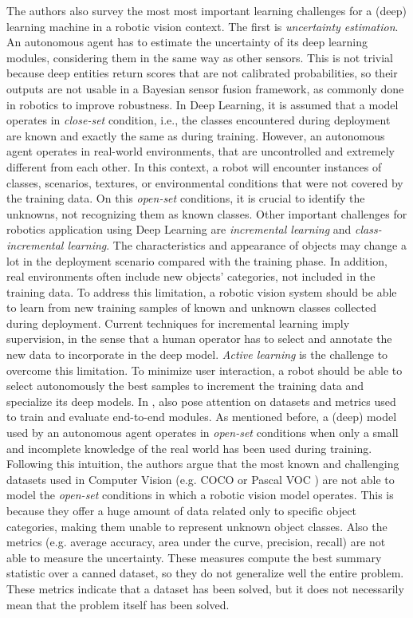  The authors also survey the most most important learning challenges for a (deep) learning machine in a robotic vision context. The first is \textit{uncertainty estimation}. An autonomous agent has to estimate the uncertainty of its deep learning modules, considering them in the same way as other sensors. This is not trivial because deep entities return scores that are not calibrated probabilities, so their outputs are not usable in a Bayesian sensor fusion framework, as commonly done in robotics to improve robustness. In Deep Learning, it is assumed that a model operates in \textit{close-set} condition,  i.e., the classes encountered during deployment are known and exactly the same as during training. However, an autonomous agent operates in real-world environments, that are uncontrolled and extremely different from each other. In this context, a robot will encounter instances of classes, scenarios, textures, or environmental conditions that were not covered by the training data. On this \textit{open-set} conditions, it is crucial to identify the unknowns, not recognizing them as known classes. Other important challenges for robotics application using Deep Learning are \textit{incremental learning} and \textit{class-incremental learning}. The characteristics and appearance of objects may change a lot in the deployment scenario compared with the training phase. In addition, real environments often include new objects' categories, not included in the training data. To address this limitation, a robotic vision system should be able to learn from new training samples of known and unknown classes collected during deployment. Current techniques for incremental learning imply supervision, in the sense that a human operator has to select and annotate the new data to incorporate in the deep model. \textit{Active learning} is the challenge to overcome this limitation. To minimize user interaction, a robot should be able to select autonomously the best samples to increment the training data and specialize its deep models. In \cite{surveydeeplimits}, \citeauthor{surveydeeplimits} also pose attention on datasets and metrics used to train and evaluate end-to-end modules. As mentioned before, a (deep) model used by an autonomous agent operates in \textit{open-set} conditions when only a small and incomplete knowledge of the real world has been used during training. Following this intuition, the authors argue that the most known and challenging datasets used in Computer Vision (e.g. COCO \cite{coco} or Pascal VOC \cite{pascal}) are not able to model the \textit{open-set} conditions in which a robotic vision model operates. This is because they offer a huge amount of data related only to specific object categories, making them unable to represent unknown object classes. Also the metrics (e.g. average accuracy, area under the curve, precision, recall) are not able to measure the uncertainty. These measures compute the best summary statistic over a canned dataset, so they do not generalize well the entire problem. These metrics indicate that a dataset has been solved, but it does not necessarily mean that the problem itself has been solved.  
 
